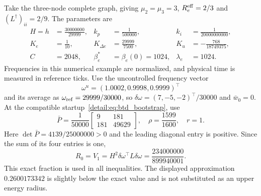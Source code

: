 Take the three-node complete graph, giving
$\mu_2=\mu_3=3$, $R_e^{\rm eff}=2/3$ and
$(L^\dagger)_{ii}=2/9$. The parameters are
\begin{align}
 H=h&=\frac{30000000}{29999},&k_p&=\frac1{500000},&k_i&=\frac1{20000000000},\nonumber\\
 K_e&=\frac1{10},&K_{\Delta e}&=\frac{29999}{7500},&K_u&=-\frac{768}{18749375},\nonumber\\
 C&=2048,&\beta^*_e&=\beta_e(0)=1024,&\lambda_e&=1024.
 \label{detail:eq:btd_example_gains}
\end{align}
Frequencies in this numerical example are normalized, and physical time is measured in reference ticks. Use the uncontrolled frequency vector
\[
 \omega^u=(1.0002,0.9998,0.9999)^\top
\]
and its average as
$\omega_{\rm ref}=29999/30000$, so
$\delta\omega=(7,-5,-2)^\top/30000$ and $\bar w_0=0$.
At the compatible startup~\eqref{detail:eq:btd_bootstrap}, use
\begin{equation}
 \bar P=\frac1{50000}\begin{bmatrix}9&181\\181&49629\end{bmatrix},
 \quad\rho=\frac{1599}{1600},\quad r=1.
 \label{detail:eq:btd_witness}
\end{equation}
Here $\det\bar P=4139/25000000>0$ and the leading diagonal entry is
positive. Since the sum of its four entries is one,
\begin{equation}
 R_0=V_1=H^2\delta\omega^\top L\delta\omega
     =\frac{234000000}{899940001}.
 \label{detail:eq:btd_d_R0}
\end{equation}
This exact fraction is used in all inequalities. The displayed approximation
$0.2600173342$ is slightly below the exact value and is not substituted as
an upper energy radius.

